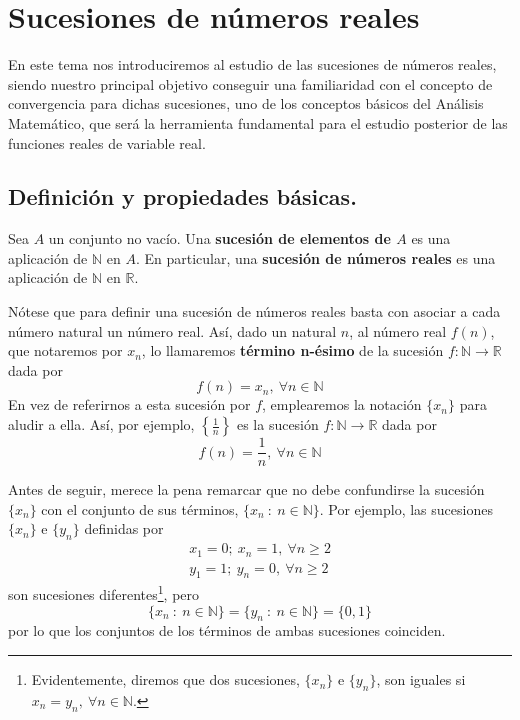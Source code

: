 \chapter{Sucesiones de números reales}

En este tema nos introduciremos al estudio de las sucesiones de números reales, siendo nuestro principal objetivo conseguir una familiaridad con el concepto de convergencia para dichas sucesiones, uno de los conceptos básicos del Análisis Matemático, que será la herramienta fundamental para el estudio posterior de las funciones reales de variable real.



\section{Definición y propiedades básicas.}
\begin{definicion}
    Sea $A$ un conjunto no vacío. Una \textbf{sucesión de elementos de $A$} es una aplicación de $\mathbb{N}$ en $A$. En particular, una \textbf{sucesión de números reales} es una aplicación de $\mathbb{N}$ en $\mathbb{R}$.
\end{definicion}

Nótese que para definir una sucesión de números reales basta con asociar a cada número natural un número real. 
Así, dado un natural $n$, al número real $f(n)$, que notaremos por $x_n$, lo llamaremos \textbf{término n-ésimo} de la sucesión $f:\mathbb{N} \longrightarrow \mathbb{R}$ dada por
\begin{equation*}
    f(n)=x_n,~\forall n \in \mathbb{N}
\end{equation*}
En vez de referirnos a esta sucesión por $f$, emplearemos la notación $\{x_n\}$ para aludir a ella.
Así, por ejemplo, $\left\{\frac{1}{n}\right\}$ es la sucesión $f:\mathbb{N} \longrightarrow \mathbb{R}$ dada por
\begin{equation*}
    f(n)=\frac{1}{n},~\forall n \in \mathbb{N}
\end{equation*}

Antes de seguir, merece la pena remarcar que no debe confundirse la sucesión $\{x_n\}$ con el conjunto
de sus términos, $\{x_n~:~n \in \mathbb{N}\}$. Por ejemplo, las sucesiones $\{x_n\}$ e $\{y_n\}$ definidas
por
\begin{gather*}
    x_1 = 0;~x_n = 1,~\forall n \geq 2\\
    y_1 = 1;~y_n = 0,~\forall n \geq 2
\end{gather*}
son sucesiones diferentes\footnote{Evidentemente, diremos que dos sucesiones, $\{x_n\}$ e $\{y_n\}$,
son iguales si $x_n = y_n,~\forall n \in \mathbb{N}$.}, pero
\begin{equation*}
    \{x_n~:~n \in \mathbb{N}\} = \{y_n~:~n \in \mathbb{N}\} = \{0,1\}
\end{equation*}
por lo que los conjuntos de los términos de ambas sucesiones coinciden.

